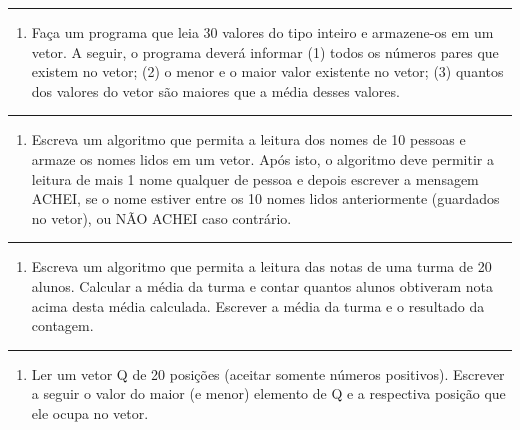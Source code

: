 \documentclass[12pt,a4paper]{article}
\renewcommand{\linethickness}{0.05em}
\providecommand{\tightlist}{%
      \setlength{\itemsep}{0pt}\setlength{\parskip}{0pt}}
\begin{document}
    \begin{center}\rule{0.5\linewidth}{\linethickness}\end{center}

\begin{enumerate}
\def\labelenumi{\arabic{enumi}.}
\setcounter{enumi}{3}
\tightlist
\item
  Faça um programa que leia 30 valores do tipo inteiro e armazene-os em
  um vetor. A seguir, o programa deverá informar (1) todos os números
  pares que existem no vetor; (2) o menor e o maior valor existente no
  vetor; (3) quantos dos valores do vetor são maiores que a média desses
  valores.
\end{enumerate}

    \begin{center}\rule{0.5\linewidth}{\linethickness}\end{center}

\begin{enumerate}
\def\labelenumi{\arabic{enumi}.}
\setcounter{enumi}{4}
\tightlist
\item
  Escreva um algoritmo que permita a leitura dos nomes de 10 pessoas e
  armaze os nomes lidos em um vetor. Após isto, o algoritmo deve
  permitir a leitura de mais 1 nome qualquer de pessoa e depois escrever
  a mensagem ACHEI, se o nome estiver entre os 10 nomes lidos
  anteriormente (guardados no vetor), ou NÃO ACHEI caso contrário.
\end{enumerate}

    \begin{center}\rule{0.5\linewidth}{\linethickness}\end{center}

\begin{enumerate}
\def\labelenumi{\arabic{enumi}.}
\setcounter{enumi}{5}
\tightlist
\item
  Escreva um algoritmo que permita a leitura das notas de uma turma de
  20 alunos. Calcular a média da turma e contar quantos alunos obtiveram
  nota acima desta média calculada. Escrever a média da turma e o
  resultado da contagem.
\end{enumerate}

    \begin{center}\rule{0.5\linewidth}{\linethickness}\end{center}

\begin{enumerate}
\def\labelenumi{\arabic{enumi}.}
\setcounter{enumi}{6}
\tightlist
\item
  Ler um vetor Q de 20 posições (aceitar somente números positivos).
  Escrever a seguir o valor do maior (e menor) elemento de Q e a
  respectiva posição que ele ocupa no vetor.
\end{enumerate}
\end{document}
